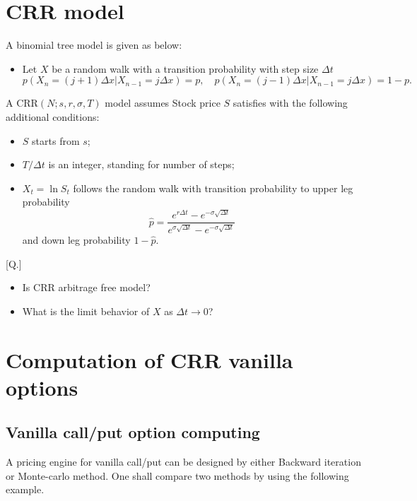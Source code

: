 \documentclass{article}
\begin{document}
\begin{center}
\end{center}


\section{CRR model}

A binomial tree model is given as below:
\begin{itemize}
 \item Let $X$ be a random walk with a transition probability with step size $\Delta t$
 $$p(X_{n} = (j+1)\Delta x | X_{n-1} = j \Delta x) = p, 
 \quad 
 p(X_{n} = (j-1)\Delta x | X_{n-1} = j \Delta x) = 1-p.
 $$
 \end{itemize}

A CRR$(N; s, r, \sigma, T)$ model assumes Stock price $S$ satisfies
with the following additional conditions:
\begin{itemize}
 \item $S$ starts from $s$;
 \item $T/\Delta t$ is an integer, standing for number of steps;
 \item $X_{t} = \ln S_{t}$ follows the random walk with transition probability 
to upper leg probability 
$$\hat p = \frac{e^{r\Delta t} - e^{-\sigma \sqrt{\Delta t}}}
{e^{\sigma \sqrt{\Delta t}} - e^{-\sigma \sqrt{\Delta t}}}$$
and down leg probability $1- \hat p$.
\end{itemize}

[Q.] 
\begin{itemize}
\item Is CRR arbitrage free model?
\item What is the limit behavior of $X$ as $\Delta t \to 0$?
\end{itemize}


\section{Computation of CRR vanilla options}




\subsection{Vanilla call/put option computing}

A pricing engine for vanilla call/put can be designed by either Backward iteration or Monte-carlo method.
One shall compare two methods by using the following example.
\end{document}

